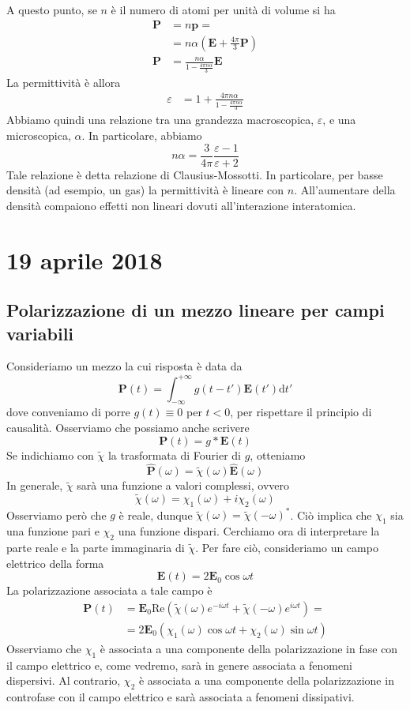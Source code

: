 \documentclass[a4paper,11pt]{book}
\renewcommand{\d}{\mathrm{d}}
\renewcommand{\vec}[1]{\mathbf{#1}}
\theoremstyle{theorem}
\theoremstyle{definition}
\begin{document}
A questo punto, se $n$ è il numero di atomi per unità di volume si ha
\begin{align*}\vec{P}&=n\vec{p}=\\&=n\alpha\left(\vec{E}+\frac{4\pi}{3}\vec{P}\right)\\\vec{P}&=\frac{n\alpha}{1-\frac{4\pi n\alpha}{3}}\vec{E}\end{align*}
La permittività è allora
\begin{align*}
	\varepsilon&=1+\frac{4\pi n\alpha}{1-\frac{4\pi n\alpha}{3}}
\end{align*}
Abbiamo quindi una relazione tra una grandezza macroscopica, $\varepsilon$, e una microscopica, $\alpha$. In particolare, abbiamo
\[n\alpha=\frac{3}{4\pi}\frac{\varepsilon-1}{\varepsilon+2}\]
Tale relazione è detta relazione di Clausius-Mossotti. In particolare, per basse densità (ad esempio, un gas) la permittività è lineare con $n$. All'aumentare della densità compaiono effetti non lineari dovuti all'interazione interatomica.
\newpage
\section{19 aprile 2018}
\subsection{Polarizzazione di un mezzo lineare per campi variabili}
Consideriamo un mezzo la cui risposta è data da
\[\vec{P}(t)=\int_{-\infty}^{+\infty}g(t-t')\vec{E}(t')\d t'\]
dove conveniamo di porre $g(t)\equiv 0$ per $t<0$, per rispettare il principio di causalità. Osserviamo che possiamo anche scrivere
\[\vec{P}(t)=g*\vec{E}(t)\]
Se indichiamo con $\tilde{\chi}$ la trasformata di Fourier di $g$, otteniamo
\[\hat{\vec{P}}(\omega)=\tilde{\chi}(\omega)\hat{\vec{E}}(\omega)\]
In generale, $\tilde{\chi}$ sarà una funzione a valori complessi, ovvero
\[\tilde{\chi}(\omega)=\chi_1(\omega)+i\chi_2(\omega)\]
Osserviamo però che $g$ è reale, dunque $\tilde\chi(\omega)=\tilde{\chi}(-\omega)^*$. Ciò implica che $\chi_1$ sia una funzione pari e $\chi_2$ una funzione dispari. Cerchiamo ora di interpretare la parte reale e la parte immaginaria di $\tilde{\chi}$. Per fare ciò, consideriamo un campo elettrico della forma
\[\vec{E}(t)=2\vec{E}_0\cos\omega t\]
La polarizzazione associata a tale campo è
\begin{align*}\vec{P}(t)&=\vec{E}_0\textrm{Re}(\tilde{\chi}(\omega)e^{-i\omega t}+\tilde{\chi}(-\omega)e^{i\omega t})=\\&=2\vec{E}_0(\chi_1(\omega)\cos\omega t+\chi_2(\omega)\sin\omega t)\end{align*}
Osserviamo che $\chi_1$ è associata a una componente della polarizzazione in fase con il campo elettrico e, come vedremo, sarà in genere associata a fenomeni dispersivi. Al contrario, $\chi_2$ è associata a una componente della polarizzazione in controfase con il campo elettrico e sarà associata a fenomeni dissipativi.
\end{document}
